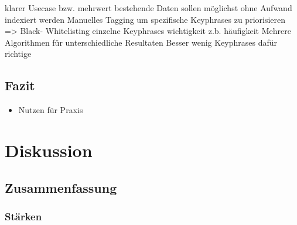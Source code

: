 klarer Usecase bzw. mehrwert
bestehende Daten sollen möglichst ohne Aufwand indexiert werden
Manuelles Tagging um spezifische Keyphrases zu priorisieren => Black- Whitelisting
einzelne Keyphrases wichtigkeit z.b. häufigkeit
Mehrere Algorithmen für unterschiedliche Resultaten
Besser wenig Keyphrases dafür richtige 

\subsection{Fazit}


\begin{itemize}
    \item Nutzen für Praxis
    
\end{itemize}

\section{Diskussion}


\subsection{Zusammenfassung}

\subsubsection{Stärken}

